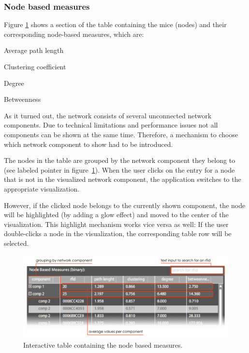 \subsubsection*{Node based measures}

Figure \ref{fig:node_based_measures} shows a section of the table containing the mice (nodes) and their corresponding node-based measures, which are:

\begin{mylist}
\item Average path length
\item Clustering coefficient
\item Degree
\item Betweenness
\end{mylist}

As it turned out, the network consists of several unconnected network components. Due to technical limitations and performance issues not all components can be shown at the same time. Therefore, a mechanism to choose which network component to show had to be introduced.

The nodes in the table are grouped by the network component they belong to (see labeled pointer in figure~\ref{fig:node_based_measures}). When the user clicks on the entry for a node that is not in the visualized network component, the application switches to the appropriate visualization.

However, if the clicked node belongs to the currently shown component, the node will be highlighted (by adding a glow effect) and moved to the center of the visualization. This highlight mechanism works vice versa as well: If the user double-clicks a node in the visualization, the corresponding table row will be selected.

\begin{figure}[!htpb]
\begin{center}
  \includegraphics[width=\textwidth]{assets/pdf/node_based_measures.pdf}
  \caption[Table containing the node based measures]{Interactive table containing the node based measures.}
  \label{fig:node_based_measures}
\end{center}
\end{figure}

